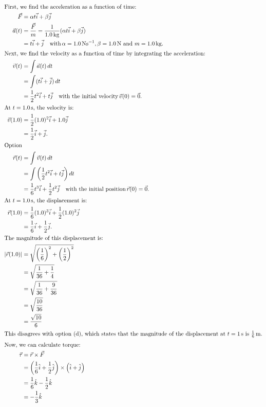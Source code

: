 	\begin{solution}
		\begin{align*}
			\intertext{First, we find the acceleration as a function of time:}
			\vec{F} &= \alpha t \vec{i} + \beta \vec{j}\\
			\vec{a}(t) &= \frac{\vec{F}}{m} = \frac{1}{1.0 \, \text{kg}}(\alpha t \vec{i} + \beta \vec{j})\\
			&= t \vec{i} + \vec{j} \quad \text{with} \, \alpha = 1.0 \, \text{Ns}^{-1}, \beta = 1.0 \, \text{N} \text{ and } m = 1.0 \, \text{kg}.\\
			\intertext{Next, we find the velocity as a function of time by integrating the acceleration:}
			\vec{v}(t) &= \int \vec{a}(t) \, dt\\
			&= \int (t \vec{i} + \vec{j}) \, dt\\
			&= \frac{1}{2} t^2 \vec{i} + t \vec{j} \quad \text{with the initial velocity} \, \vec{v}(0) = \vec{0}.\\
			\intertext{At $t=1.0 \, \text{s}$, the velocity is:}
			\vec{v}(1.0) &= \frac{1}{2} (1.0)^2 \vec{i} + 1.0 \vec{j}\\
			&= \frac{1}{2} \vec{i} + \vec{j}.\\
			\intertext{Option }
			\vec{r}(t) &= \int \vec{v}(t) \, dt\\
			&= \int \left(\frac{1}{2} t^2 \vec{i} + t \vec{j}\right) dt\\
			&= \frac{1}{6} t^3 \vec{i} + \frac{1}{2} t^2 \vec{j} \quad \text{with the initial position} \, \vec{r}(0) = \vec{0}.\\
			\intertext{At $t=1.0 \, \text{s}$, the displacement is:}
			\vec{r}(1.0) &= \frac{1}{6} (1.0)^3 \vec{i} + \frac{1}{2} (1.0)^2 \vec{j}\\
			&= \frac{1}{6} \vec{i} + \frac{1}{2} \vec{j}.\\
			\intertext{The magnitude of this displacement is:}
			|\vec{r}(1.0)| &= \sqrt{\left(\frac{1}{6}\right)^2 + \left(\frac{1}{2}\right)^2}\\
			&= \sqrt{\frac{1}{36} + \frac{1}{4}}\\
			&= \sqrt{\frac{1}{36} + \frac{9}{36}}\\
			&= \sqrt{\frac{10}{36}}\\
			&= \frac{\sqrt{10}}{6}\\
			\intertext{This disagrees with option (d), which states that the magnitude of the displacement at \( t = 1 \, \text{s} \) is \( \frac{1}{6} \, \text{m} \).}
			\intertext{Now, we can calculate torque:}
			\vec{\tau} &= \vec{r} \times \vec{F}\\
			&= \left(\frac{1}{6}\hat{i} + \frac{1}{2}\hat{j}\right) \times \left(\hat{i} +\hat{j}\right)\\
			&= \frac{1}{6}\hat{k} - \frac{1}{2}\hat{k}\\
			&= -\frac{1}{3}\hat{k}\\ 
		\end{align*}
	\end{solution}